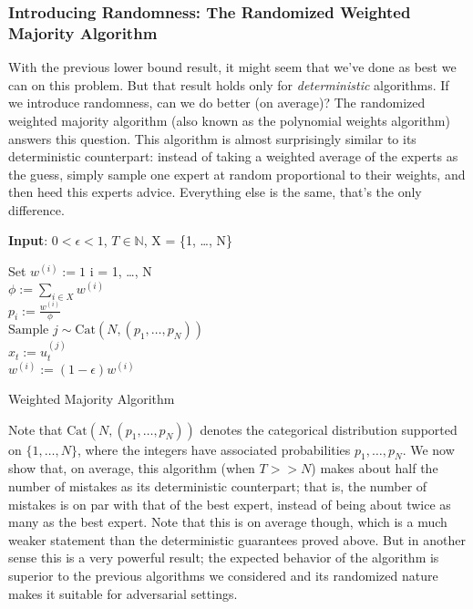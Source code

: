 \documentclass[12pt]{article}
\begin{document}
\subsubsection{Introducing Randomness: The Randomized Weighted Majority Algorithm}
With the previous lower bound result, it might seem that we've done as best we can on this problem. But that result holds only for \textit{deterministic} algorithms. If we introduce randomness, 
can we do better (on average)? The randomized weighted majority algorithm (also known as the polynomial weights algorithm) answers this question. This algorithm is almost surprisingly 
similar to its deterministic counterpart: instead of taking a weighted average of the experts as the guess, simply sample one expert at random proportional to their weights, and then heed
this experts advice. Everything else is the same, that's the only difference. 

 \begin{algorithm}[H]
	\SetAlgoLined
	
	\textbf{Input}: $0 < \epsilon < 1$, $T \in \mathbb{N}$,  X = \{1, \dots, N\} \\
	
	\bigskip
	
	Set $w^{(i)} := 1$  i = 1, \dots, N \\
	
	 {
		$\phi := \sum_{i \in X} w^{(i)}$ \\
		$p_i := \frac{w^{(i)}}{\phi}$ \\
		$\text{Sample } j \sim \text{Cat}(N, (p_1, \dots, p_N))$ \\
		$x_t := u_t^{(j)}$ \\
		
		 {
			 {
					$w^{(i)} := (1 - \epsilon)w^{(i)}$ \\
			}
		}
	}			
\caption{Weighted Majority Algorithm}
\end{algorithm}

\bigskip

Note that $\text{Cat}(N, (p_1, \dots, p_N))$ denotes the categorical distribution supported on $\{1, \dots, N\}$, where the integers have associated probabilities $p_1, \dots, p_N$. 
We now show that, on average, this algorithm (when $T >> N$) makes about half the number of mistakes as its deterministic counterpart; that is, the number of mistakes is on par
with that of the best expert, instead of being about twice as many as the best expert. Note that this is on average though, which is a much weaker statement than the deterministic 
guarantees proved above. But in another sense this is a very powerful result; the expected behavior of the algorithm is superior to the previous algorithms we considered and its 
randomized nature makes it suitable for adversarial settings. 
\end{document}

